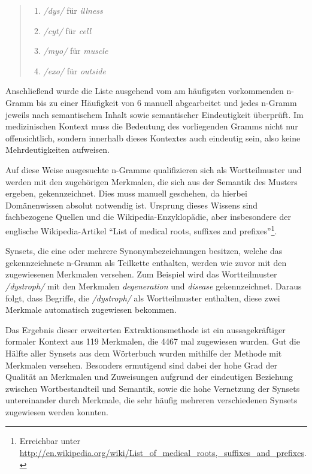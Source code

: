 \documentclass[pagesize,paper=A4,DIV=calc,fontsize=12pt,draft=false]{scrreprt}
\begin{document}
\begin{quote}
\begin{multicols}{2}
\begin{enumerate}
\item \emph{/dys/} für \emph{illness}
\item \emph{/cyt/} für \emph{cell}
\item \emph{/myo/} für \emph{muscle}
\item \emph{/exo/} für \emph{outside}
\end{enumerate}
\end{multicols}
\end{quote}

Anschließend wurde die Liste ausgehend vom am häufigsten vorkommenden n-Gramm bis zu einer Häufigkeit von 6 manuell abgearbeitet und jedes n-Gramm jeweils nach semantischem Inhalt sowie semantischer Eindeutigkeit überprüft.
Im medizinischen Kontext muss die Bedeutung des vorliegenden Gramms nicht nur offensichtlich, sondern innerhalb dieses Kontextes auch eindeutig sein, also keine Mehrdeutigkeiten aufweisen. 

Auf diese Weise ausgesuchte n-Gramme qualifizieren sich als Wortteilmuster und werden mit den zugehörigen Merkmalen, die sich aus der Semantik des Musters ergeben, gekennzeichnet. 
Dies muss manuell geschehen, da hierbei Domänenwissen absolut notwendig ist. 
Ursprung dieses Wissens sind fachbezogene Quellen und die Wikipedia-Enzyklopädie, aber insbesondere der englische Wikipedia-Artikel \enquote{List of medical roots, suffixes and prefixes}\footnote{Erreichbar unter \href{http://en.wikipedia.org/wiki/List\_of\_medical\_roots,\_suffixes\_and\_prefixes}{http://en.wikipedia.org/wiki/List\_of\_medical\_roots,\_suffixes\_and\_prefixes}.}. 

Synsets, die eine oder mehrere Synonymbezeichnungen besitzen, welche das gekennzeichnete n-Gramm als Teilkette enthalten, werden wie zuvor mit den zugewiesenen Merkmalen versehen. 
Zum Beispiel wird das Wortteilmuster \emph{/dystroph/} mit den Merkmalen \emph{degeneration} und \emph{disease} gekennzeichnet. 
Daraus folgt, dass Begriffe, die \emph{/dystroph/} als Wortteilmuster enthalten, diese zwei Merkmale automatisch zugewiesen bekommen. 

Das Ergebnis dieser erweiterten Extraktionsmethode ist ein aussagekräftiger formaler Kontext aus 119 Merkmalen, die 4467 mal zugewiesen wurden. 
Gut die Hälfte aller Synsets aus dem Wörterbuch wurden mithilfe der Methode mit Merkmalen versehen. 
Besonders ermutigend sind dabei der hohe Grad der Qualität an Merkmalen und Zuweisungen aufgrund der eindeutigen Beziehung zwischen Wortbestandteil und Semantik, sowie die hohe Vernetzung der Synsets untereinander durch Merkmale, die sehr häufig mehreren verschiedenen Synsets zugewiesen werden konnten. 
\end{document}
